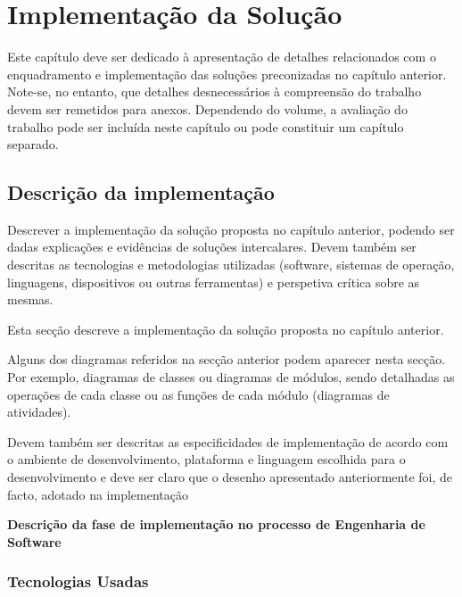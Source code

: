 % 
\chapter{Implementação da Solução} 
\label{chap:Impl} %

Este capítulo deve ser dedicado à apresentação de detalhes relacionados com o enquadramento e implementação das soluções preconizadas no capítulo anterior. Note-se, no entanto, que detalhes desnecessários à compreensão do trabalho devem ser remetidos para anexos. Dependendo do volume, a avaliação do trabalho pode ser incluída neste capítulo ou pode constituir um capítulo separado.


\section{Descrição da implementação} 
\label{sec:desc} %

Descrever a implementação da solução proposta no capítulo anterior, podendo ser dadas explicações e evidências de soluções intercalares. Devem também ser descritas as tecnologias e metodologias utilizadas (software, sistemas de operação, linguagens, dispositivos ou outras ferramentas) e perspetiva crítica sobre as mesmas. 

Esta secção descreve a implementação da solução proposta no capítulo anterior. 

Alguns dos diagramas referidos na secção anterior podem aparecer nesta secção. Por exemplo, diagramas de classes ou diagramas de módulos, sendo detalhadas as operações de cada classe ou as funções de cada módulo (diagramas de atividades). 

Devem também ser descritas as especificidades de implementação de acordo com o ambiente de desenvolvimento, plataforma e linguagem escolhida para o desenvolvimento e deve ser claro que o desenho apresentado anteriormente foi, de facto, adotado na implementação

\textbf{Descrição da fase de implementação no processo de Engenharia de Software}

\subsection{Tecnologias Usadas}

